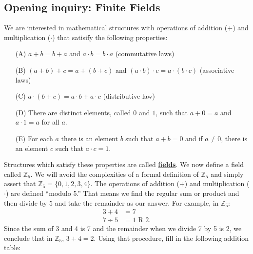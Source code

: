 \documentclass[11pt]{article}
\newenvironment{task}
	{\begin{mdframed}[linecolor=lightgray, linewidth=3pt]\raggedright}
	{\end{mdframed}}
\renewcommand\emph[1]{\underline{\bf{#1}}} %
\theoremstyle{definition}
\begin{document}
\subsection{Opening inquiry: Finite Fields}
\begin{task}
  We are interested in mathematical structures with operations of addition ($+$) and multiplication ($\cdot$) that satisify the following properties:
  \begin{itemize}
    \item[(A)] $a+b=b+a$ and $a\cdot b=b\cdot a$ (commutative laws)
    \item[(B)] $(a+b)+c = a + (b+c)$ and $(a\cdot b)\cdot c = a\cdot (b \cdot c)$ (associative laws)
    \item[(C)] $a\cdot (b+c) = a\cdot b + a \cdot c$ (distributive law)
    \item[(D)] There are distinct elements, called $0$ and $1$, such that $a+0 = a $ and $a \cdot 1 = a$ for all $a$.
    \item[(E)] For each $a$ there is an element $b$ such that $a + b = 0$ and if $a\neq 0$, there is an element $c$ such that $a\cdot c = 1$.
  \end{itemize}
  Structures which satisfy these properties are called \emph{fields}. We now define a field called $\mathbb{Z}_5$. We will avoid the complexities of a formal definition of $\mathbb{Z}_5$ and simply assert that 
  $\mathbb{Z}_5 = \{ 0, 1, 2, 3, 4\}$. The operations of addition ($+$) and multiplication ($\cdot$) are defined ``modulo 5.'' That means we find
  the regular sum or product and then divide by 5 and take the remainder as our answer. For example, in $\mathbb{Z}_5$:
  \begin{align*}
    3 + 4 &= 7\\
    7 \div 5 &= 1 \text{ R } 2.
  \end{align*}
  Since the sum of 3 and 4 is 7 and the remainder when we divide 7 by 5 is 2, we conclude that in $\mathbb{Z}_5$, $3 + 4 = 2$. Using that procedure, fill in
  the following addition table:


\end{task}
\end{document}
